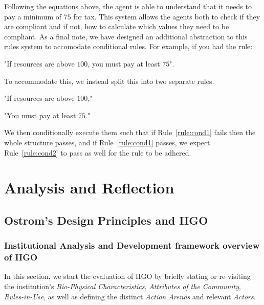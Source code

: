 Following the equations above, the agent is able to understand that it needs to pay a minimum of $75$ for tax. This system allows the agents both to check if they are compliant and if not, how to calculate which values they need to be compliant.
As a final note, we have designed an additional abstraction to this rules system to accomodate conditional rules.
For example, if you had the rule:
\begin{rule_IIGO}
    "If resources are above $100$, you must pay at least $75$".
\end{rule_IIGO} 
To accommodate this, we instead split this into two separate rules.
\begin{rule_IIGO}
    "If resources are above $100$,"
    \label{rule:cond1}
\end{rule_IIGO}
\begin{rule_IIGO}
    "You must pay at least $75$."
    \label{rule:cond2}
\end{rule_IIGO}
We then conditionally execute them such that if Rule~\ref{rule:cond1} fails then the whole structure passes, and if Rule~\ref{rule:cond1} passes, we expect Rule~\ref{rule:cond2} to pass as well for the rule to be adhered.

\section{Analysis and Reflection}
\subsection{Ostrom’s Design Principles and IIGO}
\subsubsection{Institutional Analysis and Development framework overview of IIGO}

In this section, we start the evaluation of IIGO by briefly stating or re-visiting the institution's \emph{Bio-Physical Characteristics}, \emph{Attributes of the Community}, \emph{Rules-in-Use}, as well as defining the distinct \emph{Action Arenas} and relevant \emph{Actors}.

